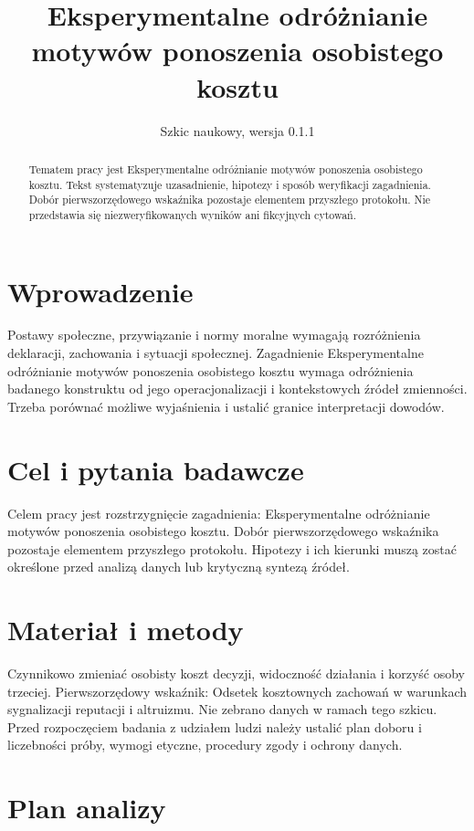 \documentclass[11pt,a4paper]{article}
\title{Eksperymentalne odróżnianie motywów ponoszenia osobistego kosztu}
\author{}
\date{Szkic naukowy, wersja 0.1.1}
\begin{document}
\maketitle

\begin{abstract}

Tematem pracy jest Eksperymentalne odróżnianie motywów ponoszenia osobistego kosztu. Tekst systematyzuje uzasadnienie, hipotezy i sposób weryfikacji zagadnienia. Dobór pierwszorzędowego wskaźnika pozostaje elementem przyszłego protokołu. Nie przedstawia się niezweryfikowanych wyników ani fikcyjnych cytowań.

\end{abstract}

\section{Wprowadzenie}

Postawy społeczne, przywiązanie i normy moralne wymagają rozróżnienia deklaracji, zachowania i sytuacji społecznej. Zagadnienie Eksperymentalne odróżnianie motywów ponoszenia osobistego kosztu wymaga odróżnienia badanego konstruktu od jego operacjonalizacji i kontekstowych źródeł zmienności. Trzeba porównać możliwe wyjaśnienia i ustalić granice interpretacji dowodów.

\section{Cel i pytania badawcze}

Celem pracy jest rozstrzygnięcie zagadnienia: Eksperymentalne odróżnianie motywów ponoszenia osobistego kosztu. Dobór pierwszorzędowego wskaźnika pozostaje elementem przyszłego protokołu. Hipotezy i ich kierunki muszą zostać określone przed analizą danych lub krytyczną syntezą źródeł.

\section{Materiał i metody}

Czynnikowo zmieniać osobisty koszt decyzji, widoczność działania i korzyść osoby trzeciej. Pierwszorzędowy wskaźnik: Odsetek kosztownych zachowań w warunkach sygnalizacji reputacji i altruizmu. Nie zebrano danych w ramach tego szkicu. Przed rozpoczęciem badania z udziałem ludzi należy ustalić plan doboru i liczebności próby, wymogi etyczne, procedury zgody i ochrony danych.

\section{Plan analizy}
\end{document}
